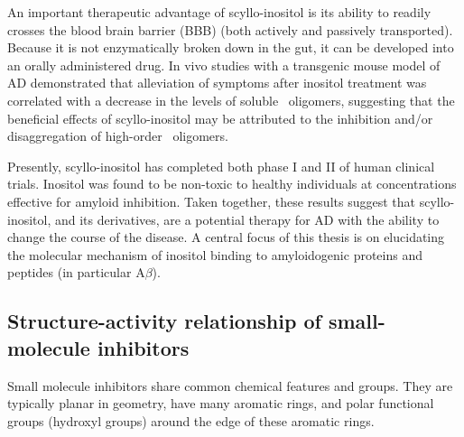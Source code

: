 An important therapeutic advantage of scyllo-inositol is its ability to readily crosses the bloodbrain barrier (BBB) (both actively and passively transported). Because it is not enzymatically broken down in the gut, it can be developed into an orally administered drug. %
In vivo studies with a transgenic mouse model of AD demonstrated that alleviation of symptoms after inositol treatment was correlated with a decrease in the levels of soluble \abeta\ oligomers, suggesting that the beneficial effects of scyllo-inositol may be attributed to the inhibition and/or disaggregation of high-order \abeta\ oligomers.\cite{McLaurin:2006eb}

Presently, scyllo-inositol has completed both phase I and II of human clinical trials.  Inositol was found to be non-toxic to healthy individuals at concentrations effective for amyloid inhibition. Taken together, these results suggest that scyllo-inositol, and its derivatives, are a potential therapy for AD with the ability to change the course of the disease.\cite{Nitz:2008jl,Sun:2008ko}  A central focus of this thesis is on elucidating the molecular mechanism of inositol binding to amyloidogenic proteins and peptides (in particular A$\beta$).

\subsection{Structure-activity relationship of small-molecule inhibitors}
Small molecule inhibitors share common chemical features and groups.  They are typically planar in geometry, have many aromatic rings, and polar functional groups (hydroxyl groups) around the edge of these aromatic rings.\cite{Stempler:2011dy,Shoval:2007p3547,Porat:2006fn,Lemkul:2012da}


